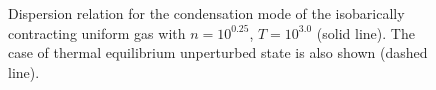 \begin{figure}[htbp]
\caption{Dispersion relation for the condensation mode of 
the isobarically contracting uniform gas
with $n=10^{0.25}$, $T=10^{3.0}$ (solid line).
The case of thermal equilibrium unperturbed state is also shown 
(dashed line).}
\label{fig:DR}
\end{figure}


